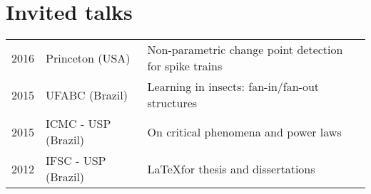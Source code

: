 \documentclass[letter,10pt]{article} %
\begin{document}
\section{Invited talks}

\begin{longtable}{p{1cm}p{3cm}p{13cm}}
  2016  & Princeton (USA) & Non-parametric change point detection for spike trains \\
  2015  & UFABC (Brazil) &  Learning in insects: fan-in/fan-out structures  \\
  2015  & ICMC - USP (Brazil) &  On critical phenomena and power laws  \\
  2012  & IFSC - USP (Brazil) &  \LaTeX for thesis and dissertations  \\
\end{longtable}
\end{document}
